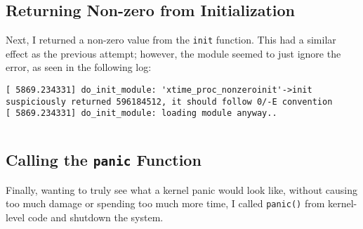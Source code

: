 \documentclass[11pt]{article}
\begin{document}
\inputminted{c}{\string~/irene/docs/latex-repo/CS_550/prog2/module/errors/xtime_proc-nullptr.c}

\subsection{Returning Non-zero from Initialization}
\label{sec:returning-non-zero}

Next, I returned a non-zero value from the \verb|init| function.
This had a similar effect as the previous attempt; however, the module seemed to just ignore the error, as seen in the following log:
\begin{verbatim}
[ 5869.234331] do_init_module: 'xtime_proc_nonzeroinit'->init suspiciously returned 596184512, it should follow 0/-E convention
[ 5869.234331] do_init_module: loading module anyway..
\end{verbatim}

\inputminted{c}{/home/zach/irene/docs/latex-repo/CS_550/prog2/module/errors/xtime_proc-nonzeroinit.c}

\subsection{Calling the \texttt{panic} Function}
\label{sec:call-panic-funct}

Finally, wanting to truly see what a kernel panic would look like, without causing too much damage or spending too much more time, I called \verb|panic()| from kernel-level code and shutdown the system.
\inputminted{c}{\string~/irene/docs/latex-repo/CS_550/prog2/module/errors/xtime_proc-panic.c}
\end{document}
